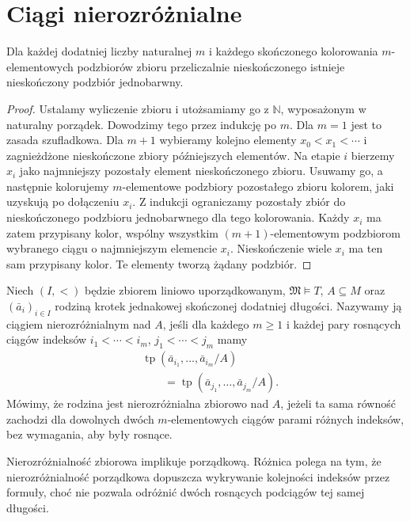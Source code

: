 \section{Ciągi nierozróżnialne}

\begin{twierdzenie}
\label{thm:mod-infinite-ramsey}
Dla każdej dodatniej liczby naturalnej $m$
i każdego skończonego kolorowania
$m$-elementowych podzbiorów zbioru
przeliczalnie nieskończonego istnieje
nieskończony podzbiór jednobarwny.
\end{twierdzenie}
\begin{proof}
Ustalamy wyliczenie zbioru i utożsamiamy go
z $\mathbb N$, wyposażonym w naturalny porządek.
Dowodzimy tego przez indukcję po $m$.
Dla $m=1$ jest to zasada szufladkowa.
Dla $m+1$ wybieramy kolejno elementy
$x_0<x_1<\cdots$ i zagnieżdżone
nieskończone zbiory późniejszych elementów.
Na etapie $i$ bierzemy $x_i$ jako najmniejszy
pozostały element nieskończonego zbioru.
Usuwamy go, a następnie
kolorujemy $m$-elementowe podzbiory
pozostałego zbioru kolorem, jaki uzyskują
po dołączeniu $x_i$. Z indukcji ograniczamy
pozostały zbiór do nieskończonego
podzbioru jednobarwnego dla tego kolorowania.
Każdy $x_i$ ma zatem przypisany kolor,
wspólny wszystkim $(m+1)$-elementowym
podzbiorom wybranego ciągu o najmniejszym
elemencie $x_i$. Nieskończenie wiele
$x_i$ ma ten sam przypisany kolor.
Te elementy tworzą żądany podzbiór.
\end{proof}

\begin{definicja}
\label{def:mod-indiscernible}
Niech $(I,<)$ będzie zbiorem liniowo uporządkowanym,
$\mathfrak M\models T$, $A\subseteq M$ oraz
$(\bar a_i)_{i\in I}$ rodziną krotek jednakowej
skończonej dodatniej długości.
Nazywamy ją ciągiem nierozróżnialnym nad $A$,
jeśli dla każdego $m\geq1$ i każdej pary
rosnących ciągów indeksów
$i_1<\cdots<i_m$, $j_1<\cdots<j_m$ mamy
\[
\begin{aligned}
&\operatorname{tp}(\bar a_{i_1},\ldots,\bar a_{i_m}/A)\\
&\qquad=
\operatorname{tp}(\bar a_{j_1},\ldots,\bar a_{j_m}/A).
\end{aligned}
\]
Mówimy, że rodzina jest nierozróżnialna zbiorowo
nad $A$, jeżeli ta sama równość zachodzi
dla dowolnych dwóch $m$-elementowych ciągów
parami różnych indeksów, bez wymagania, aby
były rosnące.
\end{definicja}

Nierozróżnialność zbiorowa implikuje porządkową.
Różnica polega na tym, że nierozróżnialność
porządkowa dopuszcza wykrywanie kolejności
indeksów przez formuły, choć nie pozwala
odróżnić dwóch rosnących podciągów tej samej
długości.

